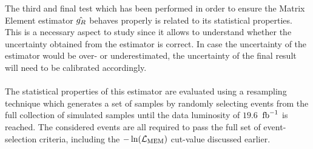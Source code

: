 The third and final test which has been performed in order to ensure the Matrix Element estimator $\hat{g_{R}}$ behaves properly is related to its statistical properties.
This is a necessary aspect to study since it allows to understand whether the uncertainty obtained from the estimator is correct. 
In case the uncertainty of the estimator would be over- or underestimated, the uncertainty of the final result will need to be calibrated accordingly.
\\
\\
The statistical properties of this estimator are evaluated using a resampling technique which generates a set of samples by randomly selecting events from the full collection of simulated samples until the data luminosity of $19.6$ $\, \mathrm{fb}^{-1}$ is reached.
The considered events are all required to pass the full set of event-selection criteria, including the $-\ln(\mathcal{L}_{\textrm{MEM}})$ cut-value discussed earlier.%
\\

